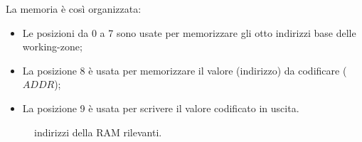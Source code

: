 La memoria è così organizzata:
\begin{itemize}
	\item Le posizioni da 0 a 7 sono usate per memorizzare gli otto indirizzi base delle working-zone;
	
	\item La posizione 8 è usata per memorizzare il valore (indirizzo) da codificare ($ADDR$);
	
	\item La posizione 9 è usata per scrivere il valore codificato in uscita.
\end{itemize}

\begin{figure}[!htb]
	\centering
	
	\caption{indirizzi della RAM rilevanti.}
	\label{fig:ram_1}
\end{figure}

%

